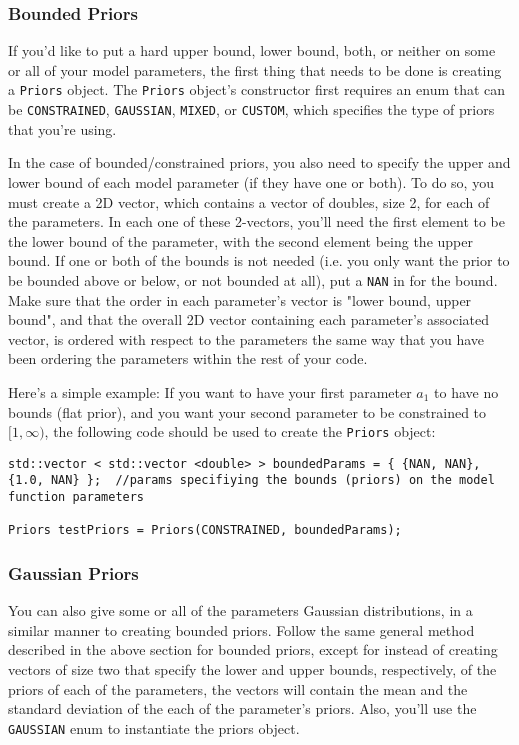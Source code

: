 \documentclass[12pt]{article}
\newcommand{\li}{\lstinline}
\begin{document}
\subsubsection{Bounded Priors}
If you'd like to put a hard upper bound, lower bound, both, or neither on some or all of your model parameters, the first thing that needs to be done is creating a \lstinline{Priors} object. The \li{Priors} object's constructor first requires an enum that can be \li{CONSTRAINED}, \li{GAUSSIAN}, \li{MIXED}, or \li{CUSTOM}, which specifies the type of priors that you're using. 

In the case of bounded/constrained priors, you also need to specify the upper and lower bound of each model parameter (if they have one or both). To do so, you must create a 2D vector, which contains a vector of doubles, size 2, for each of the parameters. In each one of these 2-vectors, you'll need the first element to be the lower bound of the parameter, with the second element being the upper bound. If one or both of the bounds is not needed (i.e. you only want the prior to be bounded above or below, or not bounded at all), put a \li{NAN} in for the bound. Make sure that the order in each parameter's vector is "lower bound, upper bound", and that the overall 2D vector containing each parameter's associated vector, is ordered with respect to the parameters the same way that you have been ordering the parameters within the rest of your code.
\par Here's a simple example: If you want to have your first parameter $a_1$ to have no bounds (flat prior), and you want your second parameter to be constrained to $[1,\infty)$, the following code should be used to create the \li{Priors} object:
\begin{lstlisting}
std::vector < std::vector <double> > boundedParams = { {NAN, NAN}, {1.0, NAN} };  //params specifiying the bounds (priors) on the model function parameters

Priors testPriors = Priors(CONSTRAINED, boundedParams);
\end{lstlisting}
\subsubsection{Gaussian Priors}
\par You can also give some or all of the parameters Gaussian distributions, in a similar manner to creating bounded priors. Follow the same general method described in the above section for bounded priors, except for instead of creating vectors of size two that specify the lower and upper bounds, respectively, of the priors of each of the parameters, the vectors will contain the mean and the standard deviation of the each of the parameter's priors. Also, you'll use the \li{GAUSSIAN} enum to instantiate the priors object. 
\end{document}
